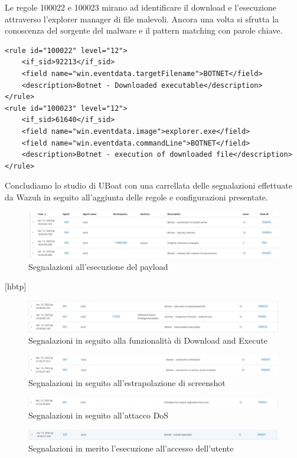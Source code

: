 \medskip
Le regole 100022 e 100023 mirano ad identificare il download e l'esecuzione attraverso l'explorer manager di file malevoli. Ancora una volta si sfrutta la conoscenza del sorgente del malware e il pattern matching con parole chiave.
\begin{lstlisting}
<rule id="100022" level="12">
    <if_sid>92213</if_sid>
    <field name="win.eventdata.targetFilename">BOTNET</field>
    <description>Botnet - Downloaded executable</description>
</rule>
<rule id="100023" level="12">
    <if_sid>61640</if_sid>
    <field name="win.eventdata.image">explorer.exe</field>
    <field name="win.eventdata.commandLine">BOTNET</field>
    <description>Botnet - execution of downloaded file</description>
</rule>
\end{lstlisting}

Concludiamo lo studio di UBoat con una carrellata delle segnalazioni effettuate da Wazuh in seguito all'aggiunta delle regole e configurazioni presentate.
\begin{figure}[hbtp]
    \centering
    \includegraphics[width=\textwidth]{res/fig/uboat-result1.png}
    \caption{Segnalazioni all'esecuzione del payload}
\end{figure}[hbtp]
\begin{figure}
    \centering
    \includegraphics[width=\textwidth]{res/fig/uboat-result2.png}
    \caption{Segnalazioni in seguito alla funzionalità di Download and Execute}
\end{figure}
\begin{figure}[hbtp]
    \centering
    \includegraphics[width=\textwidth]{res/fig/uboat-result3.png}
    \caption{Segnalazioni in seguito all'estrapolazione di screenshot}
\end{figure}
\begin{figure}[hbtp]
    \centering
    \includegraphics[width=\textwidth]{res/fig/uboat-result4.png}
    \caption{Segnalazioni in seguito all'attacco DoS}
\end{figure}
\begin{figure}[hbtp]
    \centering
    \includegraphics[width=\textwidth]{res/fig/uboat-result5.png}
    \caption{Segnalazioni in merito l'esecuzione all'accesso dell'utente}
\end{figure}
